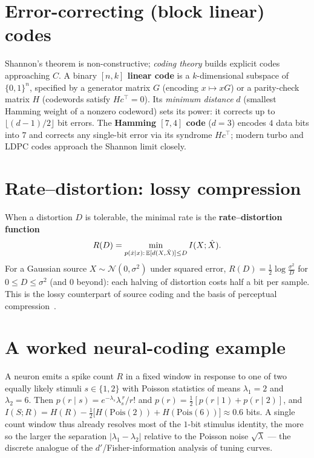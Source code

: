 \documentclass[11pt]{article}
\begin{document}
\section{Error-correcting (block linear) codes}
Shannon's theorem is non-constructive; \emph{coding theory} builds explicit codes approaching $C$.
A binary \textbf{$[n,k]$ linear code} is a $k$-dimensional subspace of $\{0,1\}^n$, specified by a
generator matrix $G$ (encoding $x\mapsto xG$) or a parity-check matrix $H$ (codewords satisfy
$Hc^\top=0$). Its \emph{minimum distance} $d$ (smallest Hamming weight of a nonzero codeword) sets
its power: it corrects up to $\lfloor(d-1)/2\rfloor$ bit errors. The \textbf{Hamming $[7,4]$ code}
($d=3$) encodes $4$ data bits into $7$ and corrects any single-bit error via its syndrome
$Hc^\top$; modern turbo and LDPC codes approach the Shannon limit closely.

\section{Rate--distortion: lossy compression}
When a distortion $D$ is tolerable, the minimal rate is the \textbf{rate--distortion function}
\begin{equation}
  R(D)=\min_{p(\hat x\mid x):\,\mathbb{E}[d(X,\hat X)]\le D} I(X;\hat X).
\end{equation}
For a Gaussian source $X\sim\mathcal N(0,\sigma^2)$ under squared error,
$R(D)=\tfrac12\log\frac{\sigma^2}{D}$ for $0\le D\le\sigma^2$ (and $0$ beyond): each halving of
distortion costs half a bit per sample. This is the lossy counterpart of source coding and the
basis of perceptual compression~\cite{coverthomas}.

\section{A worked neural-coding example}
A neuron emits a spike count $R$ in a fixed window in response to one of two equally likely stimuli
$s\in\{1,2\}$ with Poisson statistics of means $\lambda_1=2$ and $\lambda_2=6$. Then
$p(r\mid s)=e^{-\lambda_s}\lambda_s^{\,r}/r!$ and $p(r)=\tfrac12[p(r\mid1)+p(r\mid2)]$, and
$I(S;R)=H(R)-\tfrac12\big[H(\mathrm{Pois}(2))+H(\mathrm{Pois}(6))\big]\approx0.6$ bits. A single
count window thus already resolves most of the $1$-bit stimulus identity, the more so the larger the
separation $|\lambda_1-\lambda_2|$ relative to the Poisson noise $\sqrt\lambda$ --- the discrete
analogue of the $d'$/Fisher-information analysis of tuning curves.
\end{document}

